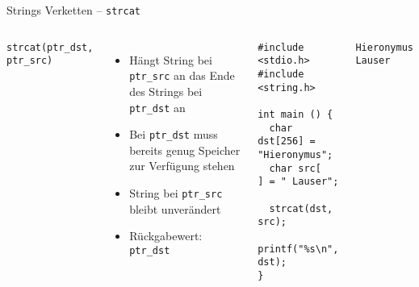 \begin{frame}[fragile]{Strings Verketten -- \texttt{strcat}}
%
\begin{columns}[T]
\begin{codebox}[Syntax]
\footnotesize\texttt{strcat(ptr\_dst, ptr\_src)}
\end{codebox}
%
\begin{itemize}
\item Hängt String bei \texttt{ptr\_src} an das Ende des Strings bei \texttt{ptr\_dst} an
\item Bei \texttt{ptr\_dst} muss bereits genug Speicher zur Verfügung stehen
\item String bei \texttt{ptr\_src} bleibt unverändert
\item Rückgabewert: \texttt{ptr\_dst}
\end{itemize}
%
\begin{codebox}[Beispiel]
\begin{verbatim}
#include <stdio.h>
#include <string.h>

int main () {
  char dst[256] = "Hieronymus";
  char src[   ] = " Lauser";

  strcat(dst, src);
  printf("%s\n", dst);
}
\end{verbatim}
\end{codebox}
%
\begin{cmdbox}[Ausgabe]
\scriptsize\texttt{Hieronymus Lauser}
\end{cmdbox}
%
\end{columns}
%
\end{frame}


